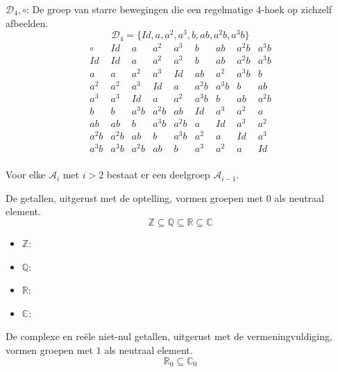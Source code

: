 \documentclass[main.tex]{subfiles}
\begin{document}
\begin{vb}
  $\mathcal{D}_{4},\circ$: De groep van starre bewegingen die een regelmatige $4$-hoek op zichzelf afbeelden.
  \[ \mathcal{D}_{4} = \{ Id, a, a^{2}, a^{3}, b, ab, a^{2}b, a^{3}b \} \]
  \[
  \begin{array}{c|cccccccc}
    \circ & Id & a & a^{2} & a^{3} & b & ab & a^{2}b & a^{3}b \\
    \hline
    Id & Id & a  & a^{2} & a^{3} & b & ab & a^{2}b & a^{3}b \\
    a & a & a^{2} & a^{3} & Id & ab & a^{2} & a^{3}b & b \\
    a^{2} & a^{2} & a^{3} & Id & a & a^{2}b & a^{3}b & b & ab \\
    a^{3} & a^{3} & Id & a & a^{2} & a^{3}b & b & ab & a^{2}b \\
    b & b & a^{3}b & a^{2}b & ab & Id & a^{3} & a^{2} & a \\
    ab & ab & b & a^{3}b & a^{2}b & a & Id & a^{3} & a^{2} \\
    a^{2}b & a^{2}b & ab & b & a^{3}b & a^{2} & a & Id & a^{3} \\
    a^{3}b & a^{3}b & a^{2}b & ab & b & a^{3} & a^{2} & a & Id \\
  \end{array}
  \]
\commn \cycln
\end{vb}

\begin{st}
  Voor elke $\mathcal{A}_{i}$ met $i>2$ bestaat er een deelgroep $\mathcal{A}_{i-1}$.
\end{st}

\begin{vb}
  De getallen, uitgerust met de optelling, vormen groepen met $0$ als neutraal element.
  \[ \mathbb{Z} \subseteq \mathbb{Q} \subseteq \mathbb{R} \subseteq \mathbb{C} \]
  \begin{itemize}
  \item $\mathbb{Z}$: 
  \item $\mathbb{Q}$: \cycln
  \item $\mathbb{R}$: \cycln
  \item $\mathbb{C}$: \cycln
  \end{itemize}
\commj 
\end{vb}

\begin{vb}
  De complexe en re\"ele niet-nul getallen, uitgerust met de vermeningvuldiging, vormen groepen met $1$ als neutraal element.
  \[ \mathbb{R}_{0} \subseteq \mathbb{C}_{0} \]
\commj \cycln
\end{vb}
\end{document}

